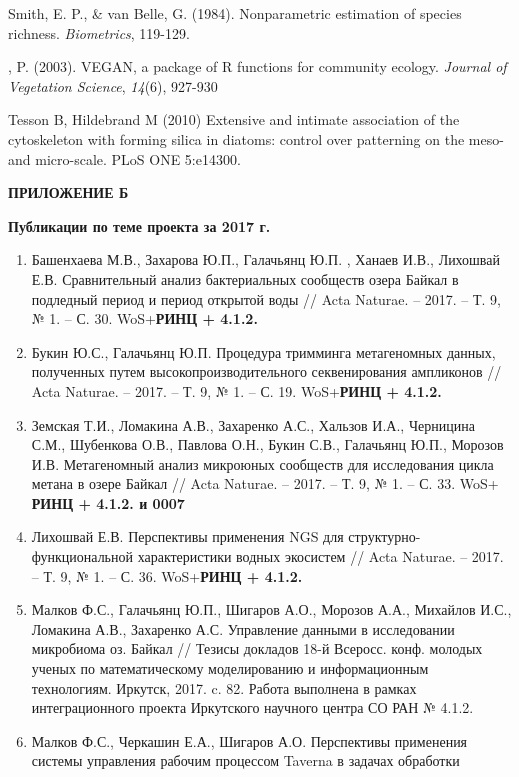 \documentclass[a4paper,12pt,openany,final]{extreport}
\begin{document}
Smith, E. P., \& van Belle, G. (1984). Nonparametric estimation of
species richness. \emph{Biometrics}, 119-129.

, P. (2003). VEGAN, a package of R functions for community ecology.
\emph{Journal of Vegetation Science}, \emph{14}(6), 927-930

Tesson B, Hildebrand M (2010) Extensive and intimate association of the
cytoskeleton with forming silica in diatoms: control over patterning on
the meso- and micro-scale. PLoS ONE 5:e14300.

\textbf{ПРИЛОЖЕНИЕ Б}

\textbf{Публикации по теме проекта за 2017 г.}

\begin{enumerate}
\def\labelenumi{\arabic{enumi}.}
\item
  Башенхаева М.В., Захарова Ю.П., Галачьянц Ю.П. , Ханаев И.В., Лихошвай
  Е.В. Сравнительный анализ бактериальных сообществ озера Байкал в
  подледный период и период открытой воды // Acta Naturae. -- 2017. --
  Т. 9, № 1. -- С. 30. WoS+\textbf{РИНЦ + 4.1.2.}
\item
  Букин Ю.С., Галачьянц Ю.П. Процедура тримминга метагеномных данных,
  полученных путем высокопроизводительного секвенирования ампликонов //
  Acta Naturae. -- 2017. -- Т. 9, № 1. -- С. 19. WoS+\textbf{РИНЦ +
  4.1.2.}
\item
  Земская Т.И., Ломакина А.В., Захаренко А.С., Хальзов И.А., Черницина
  С.М., Шубенкова О.В., Павлова О.Н., Букин С.В., Галачьянц Ю.П.,
  Морозов И.В. Метагеномный анализ микроюных сообществ для исследования
  цикла метана в озере Байкал // Acta Naturae. -- 2017. -- Т. 9, № 1. --
  С. 33. WoS+ \textbf{РИНЦ + 4.1.2. и 0007}
\item
  Лихошвай Е.В. Перспективы применения NGS для структурно-функциональной
  характеристики водных экосистем // Acta Naturae. -- 2017. -- Т. 9, №
  1. -- С. 36. WoS+\textbf{РИНЦ + 4.1.2.}
\item
  Малков Ф.С., Галачьянц Ю.П., Шигаров А.О., Морозов А.А., Михайлов
  И.С., Ломакина А.В., Захаренко А.С. Управление данными в исследовании
  микробиома оз. Байкал // Тезисы докладов 18-й Всеросс. конф. молодых
  ученых по математическому моделированию и информационным технологиям.
  Иркутск, 2017. c. 82. Работа выполнена в рамках интеграционного
  проекта Иркутского научного центра СО РАН № 4.1.2.
\item
  Малков Ф.С., Черкашин Е.А., Шигаров А.О. Перспективы применения
  системы управления рабочим процессом Taverna в задачах обработки

\end{enumerate}
\end{document}
